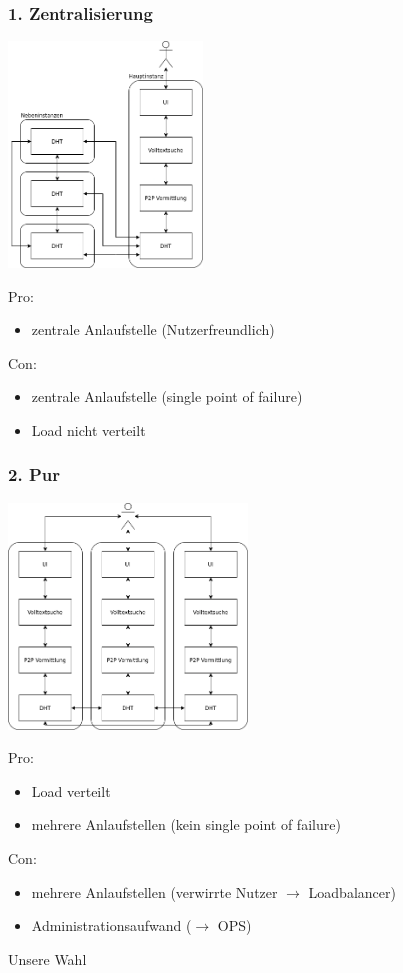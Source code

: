 \documentclass{beamer}
\begin{document}
\begin{frame}[allowframebreaks]
  \frametitle{1. Zentralisierung}

  \begin{center}
    \includegraphics[height=6cm]{Hauptinstanz}
  \end{center}

  \break
  Pro:
  \begin{itemize}
    \item zentrale Anlaufstelle (Nutzerfreundlich)
  \end{itemize}

  Con:
  \begin{itemize}
    \item zentrale Anlaufstelle (single point of failure)
    \item Load nicht verteilt
  \end{itemize}
\end{frame}

\begin{frame}[allowframebreaks]
  \frametitle{2. Pur}

  \begin{center}
    \includegraphics[height=6cm]{Gleichberechtigt}
  \end{center}

  \break
  Pro:
  \begin{itemize}
    \item Load verteilt
    \item mehrere Anlaufstellen (kein single point of failure)
  \end{itemize}

  Con:
  \begin{itemize}
    \item mehrere Anlaufstellen (verwirrte Nutzer $\rightarrow$ Loadbalancer)
    \item Administrationsaufwand ($\rightarrow$ OPS)
  \end{itemize}

  \bigskip

  Unsere Wahl
\end{frame}
\end{document}
